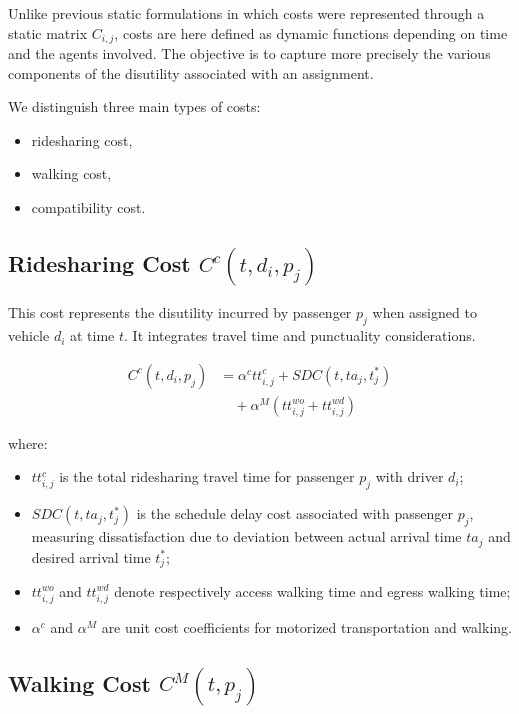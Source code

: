 \documentclass[12pt, a4paper]{article}
\begin{document}
Unlike previous static formulations in which costs were represented through a static matrix $C_{i,j}$, costs are here defined as dynamic functions depending on time and the agents involved. The objective is to capture more precisely the various components of the disutility associated with an assignment.

We distinguish three main types of costs:

\begin{itemize}
    \item ridesharing cost,
    \item walking cost,
    \item compatibility cost.
\end{itemize}

\subsection{Ridesharing Cost $C^c(t,d_i,p_j)$}

This cost represents the disutility incurred by passenger $p_j$ when assigned to vehicle $d_i$ at time $t$. It integrates travel time and punctuality considerations.

$$
\begin{aligned}
C^c(t,d_i,p_j)
&=
\alpha^c tt_{i,j}^c
+
SDC(t,ta_j,t_j^*)
\\
&\quad
+
\alpha^M
\left(
tt_{i,j}^{wo}
+
tt_{i,j}^{wd}
\right)
\end{aligned}
$$

where:

\begin{itemize}
    \item $tt_{i,j}^c$ is the total ridesharing travel time for passenger $p_j$ with driver $d_i$;

    \item $SDC(t,ta_j,t_j^*)$ is the schedule delay cost associated with passenger $p_j$, measuring dissatisfaction due to deviation between actual arrival time $ta_j$ and desired arrival time $t_j^*$;

    \item $tt_{i,j}^{wo}$ and $tt_{i,j}^{wd}$ denote respectively access walking time and egress walking time;

    \item $\alpha^c$ and $\alpha^M$ are unit cost coefficients for motorized transportation and walking.
\end{itemize}

\subsection{Walking Cost $C^M(t,p_j)$}
\end{document}
